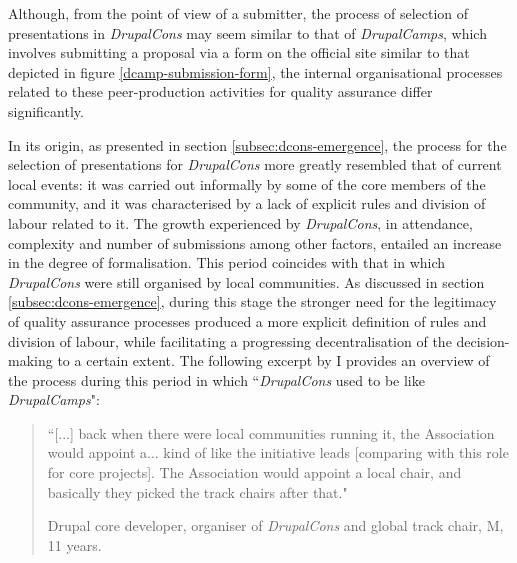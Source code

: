 Although, from the point of view of a submitter, the process of selection of presentations in \textit{DrupalCons} may seem similar to that of \textit{DrupalCamps}, which involves submitting a proposal via a form on the official site similar to that depicted in figure \ref{dcamp-submission-form}, the internal organisational processes related to these peer-production activities for quality assurance differ significantly.

In its origin, as presented in section \ref{subsec:dcons-emergence}, the process for the selection of presentations for \textit{DrupalCons} more greatly resembled that of current local events: it was carried out informally by some of the core members of the community, and it was characterised by a lack of explicit rules and division of labour related to it. The growth experienced by \textit{DrupalCons}, in attendance, complexity and number of submissions among other factors, entailed an increase in the degree of formalisation. This period coincides with that in which \textit{DrupalCons} were still organised by local communities. As discussed in section \ref{subsec:dcons-emergence}, during this stage the stronger need for the legitimacy of quality assurance processes produced a more explicit definition of rules and division of labour, while facilitating a progressing decentralisation of the decision-making to a certain extent. The following excerpt by I provides an overview of the process during this period in which ``\textit{DrupalCons} used to be like \textit{DrupalCamps}":

\begin{quotation}
``[...] back when there were local communities running it, the Association would appoint a... kind of like the initiative leads [comparing with this role for core projects]. The Association would appoint a local chair, and basically they picked the track chairs after that."

\begin{flushright}\footnotesize{Drupal core developer, organiser of \textit{DrupalCons} and global track chair, M, 11 years.}\end{flushright}
\end{quotation}

